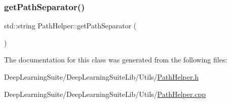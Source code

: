 \subsubsection{\texorpdfstring{get\+Path\+Separator()}{getPathSeparator()}}
{\footnotesize\ttfamily std\+::string Path\+Helper\+::get\+Path\+Separator (\begin{DoxyParamCaption}{ }\end{DoxyParamCaption})\hspace{0.3cm}{\ttfamily [static]}}



The documentation for this class was generated from the following files\+:\begin{DoxyCompactItemize}
\item 
Deep\+Learning\+Suite/\+Deep\+Learning\+Suite\+Lib/\+Utils/\hyperlink{_path_helper_8h}{Path\+Helper.\+h}\item 
Deep\+Learning\+Suite/\+Deep\+Learning\+Suite\+Lib/\+Utils/\hyperlink{_path_helper_8cpp}{Path\+Helper.\+cpp}\end{DoxyCompactItemize}
